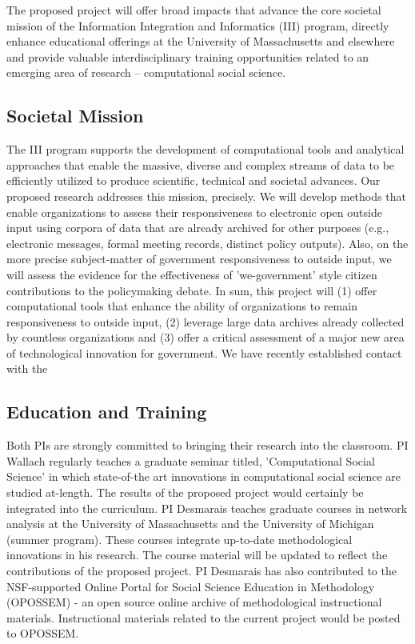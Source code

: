 The proposed project will offer broad impacts that advance the core societal mission of the Information Integration and Informatics (III) program, directly enhance educational offerings at the University of Massachusetts and elsewhere and provide valuable interdisciplinary training opportunities related to an emerging area of research -- computational social science.

\subsection{Societal Mission}

The III program supports the development of computational tools and analytical approaches that enable the massive, diverse and complex streams of data to be efficiently utilized to produce scientific, technical and societal advances. Our proposed research addresses this mission, precisely. We will develop methods that enable organizations to assess their responsiveness to electronic open outside input using corpora of data that are already archived for other purposes (e.g., electronic messages, formal meeting records, distinct policy outputs). Also, on the more precise subject-matter of government responsiveness to outside input, we will assess the evidence for the effectiveness of 'we-government' style citizen contributions to the policymaking debate. In sum, this project will (1) offer computational tools that enhance the ability of organizations to remain responsiveness to outside input, (2) leverage large data archives already collected by countless organizations and (3) offer a critical assessment of a major new area of technological innovation for government. We have recently established contact with the 

\subsection{Education and Training}

Both PIs are strongly committed to bringing their research into the classroom. PI Wallach regularly teaches a graduate seminar titled, 'Computational Social Science' in which state-of-the art innovations in computational social science are studied at-length. The results of the proposed project would certainly be integrated into the curriculum. PI Desmarais teaches graduate courses in network analysis at the University of Massachusetts and the University of Michigan (summer program). These courses integrate up-to-date methodological innovations in his research. The course material will be updated to reflect the contributions of the proposed project. PI Desmarais has also contributed to the NSF-supported Online Portal for Social Science Education in Methodology (OPOSSEM) - an open source online archive of methodological instructional materials. Instructional materials related to the current project would be posted to OPOSSEM.

